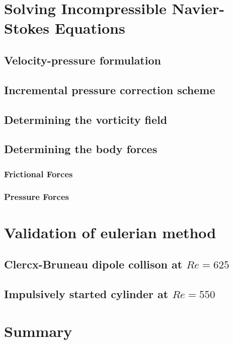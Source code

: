 \section{Solving Incompressible Navier-Stokes Equations}

\subsection{Velocity-pressure formulation}

\subsection{Incremental pressure correction scheme}

\subsection{Determining the vorticity field}

\subsection{Determining the body forces}

\subsubsection*{Frictional Forces}

\subsubsection*{Pressure Forces}


\section{Validation of eulerian method}


\subsection{Clercx-Bruneau dipole collison at $Re=625$}

\subsection{Impulsively started cylinder at $Re=550$}

\section{Summary}

